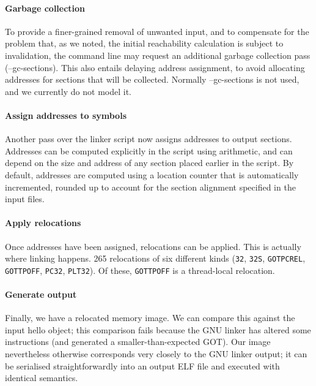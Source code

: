 \paragraph{Garbage collection} To provide a finer-grained 
removal of unwanted input, and to compensate for the problem that, as we noted,
the initial reachability calculation is subject to invalidation, 
the command line may request an additional garbage collection pass (\textsf{--gc-sections}).
This also entails delaying address assignment, to avoid allocating addresses for sections
that will be collected.
Normally \textsf{--gc-sections} is not used, and we currently do not model it.

\paragraph{Assign addresses to symbols} Another pass over the linker script now
assigns addresses to output sections. 
Addresses can be computed explicitly in the script using arithmetic, and can depend on the size
and address of any section placed earlier in the script. 
By default, addresses are computed using a location counter
that is automatically incremented, rounded up to account for the section alignment specified in the input files.

\paragraph{Apply relocations} Once addresses have been assigned, relocations can be applied.
This is actually where linking happens. 
265 relocations of six different kinds (\texttt{32}, \texttt{32S}, \texttt{GOTPCREL}, 
\texttt{GOTTPOFF}, \texttt{PC32}, \texttt{PLT32}).
Of these, \texttt{GOTTPOFF} is a thread-local relocation.

\paragraph{Generate output} Finally, we have a relocated memory image.
We can compare this against the input \textsf{hello} object; this comparison fails
because the GNU linker has altered some instructions (and generated a smaller-than-expected GOT).
Our image nevertheless otherwise corresponds very closely to the GNU linker output; 
it can be serialised straightforwardly into an output ELF file and executed with identical
semantics.
